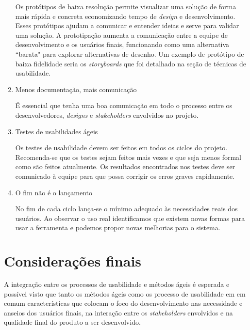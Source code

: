 \begin{enumerate}
Os protótipos de baixa resolução permite visualizar uma solução de forma mais rápida e concreta economizando tempo de \emph{design} e desenvolvimento. Esses protótipos ajudam a comunicar e entender ideias e serve para validar uma solução. 
%
A prototipação aumenta a comunicação entre a equipe de desenvolvimento e os usuários finais, funcionando como uma alternativa ``barata" para explorar alternativas de desenho. Um exemplo de protótipo de baixa fidelidade seria os \emph{storyboards} que foi detalhado na seção de técnicas de usabilidade.
	
\item Menos documentação, mais comunicação

	É essencial que tenha uma boa comunicação em todo o processo entre os desenvolvedores, \emph{designs} e \textit{stakeholders} envolvidos no projeto.



\item Testes de usabilidades ágeis

	Os testes de usabilidade devem ser feitos em todos os ciclos do projeto. Recomenda-se que os testes sejam feitos mais vezes e que seja menos formal como são feitos atualmente. Os resultados encontrados nos testes deve ser comunicado à equipe para que possa corrigir os erros  graves rapidamente.


\item O fim não é o lançamento

	No fim de cada ciclo lança-se o mínimo adequado às necessidades reais dos usuários. Ao observar o uso real identificamos que existem novas formas para usar a ferramenta e podemos propor novas melhorias para o sistema. 
	
\end{enumerate}




\section{Considerações finais}

	A integração entre os processos de usabilidade e métodos ágeis é esperada e possível visto que tanto os métodos ágeis como os processo de usabilidade em em comum características que colocam o foco do desenvolvimento nas necessidade e anseios dos usuários finais, na interação entre os \textit{stakeholders} envolvidos e na qualidade final do produto a ser desenvolvido.






